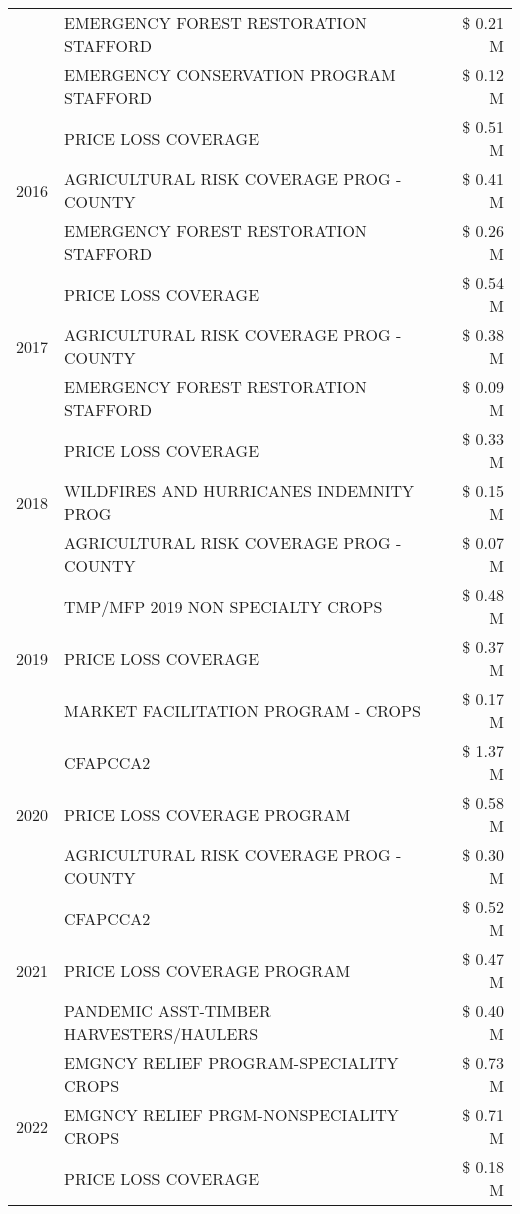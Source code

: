 \begin{tabular}{llr}
 & EMERGENCY FOREST RESTORATION STAFFORD & \$ 0.21 M \\
 & EMERGENCY CONSERVATION PROGRAM STAFFORD & \$ 0.12 M \\
\cline{1-3}
\multirow[t]{3}{*}{2016} & PRICE LOSS COVERAGE & \$ 0.51 M \\
 & AGRICULTURAL RISK COVERAGE PROG - COUNTY & \$ 0.41 M \\
 & EMERGENCY FOREST RESTORATION STAFFORD & \$ 0.26 M \\
\cline{1-3}
\multirow[t]{3}{*}{2017} & PRICE LOSS COVERAGE & \$ 0.54 M \\
 & AGRICULTURAL RISK COVERAGE PROG - COUNTY & \$ 0.38 M \\
 & EMERGENCY FOREST RESTORATION STAFFORD & \$ 0.09 M \\
\cline{1-3}
\multirow[t]{3}{*}{2018} & PRICE LOSS COVERAGE & \$ 0.33 M \\
 & WILDFIRES AND HURRICANES INDEMNITY PROG & \$ 0.15 M \\
 & AGRICULTURAL RISK COVERAGE PROG - COUNTY & \$ 0.07 M \\
\cline{1-3}
\multirow[t]{3}{*}{2019} & TMP/MFP 2019 NON SPECIALTY CROPS & \$ 0.48 M \\
 & PRICE LOSS COVERAGE & \$ 0.37 M \\
 & MARKET FACILITATION PROGRAM - CROPS & \$ 0.17 M \\
\cline{1-3}
\multirow[t]{3}{*}{2020} & CFAPCCA2 & \$ 1.37 M \\
 & PRICE LOSS COVERAGE PROGRAM & \$ 0.58 M \\
 & AGRICULTURAL RISK COVERAGE PROG - COUNTY & \$ 0.30 M \\
\cline{1-3}
\multirow[t]{3}{*}{2021} & CFAPCCA2 & \$ 0.52 M \\
 & PRICE LOSS COVERAGE PROGRAM & \$ 0.47 M \\
 & PANDEMIC ASST-TIMBER HARVESTERS/HAULERS & \$ 0.40 M \\
\cline{1-3}
\multirow[t]{3}{*}{2022} & EMGNCY RELIEF PROGRAM-SPECIALITY CROPS & \$ 0.73 M \\
 & EMGNCY RELIEF PRGM-NONSPECIALITY CROPS & \$ 0.71 M \\
 & PRICE LOSS COVERAGE & \$ 0.18 M \\
\cline{1-3}
\bottomrule
\end{tabular}

